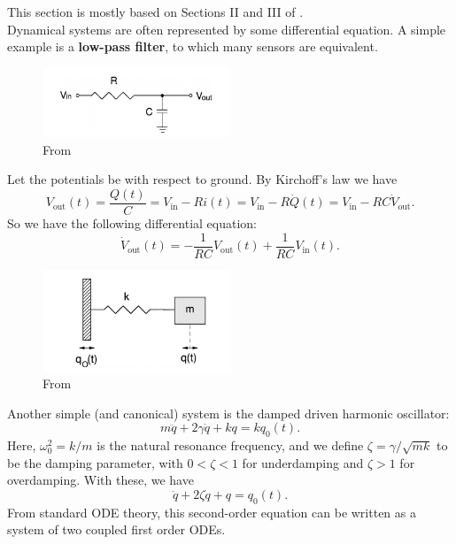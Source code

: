 \documentclass{book}
\theoremstyle{definition}
\newcommand{\f}[2]{\frac{#1}{#2}}
\begin{document}
This section is mostly based on Sections II and III of \cite{bechhoefer2005feedback}. \\


Dynamical systems are often represented by some differential equation. A simple example is a \textbf{low-pass filter}, to which many sensors are equivalent. 

\begin{figure}[!htb]
	\centering
	\includegraphics[width=0.5\textwidth]{images/low-pass-filter}
	\caption{From \cite{bechhoefer2005feedback}}
\end{figure}

Let the potentials be with respect to ground. By Kirchoff's law we have
\begin{equation*}
V_\text{out}(t) = \f{Q(t)}{C} = V_\text{in} - Ri(t) = V_\text{in} - R\dot{Q}(t) = V_\text{in} - RC\dot{V}_\text{out}.
\end{equation*}
So we have the following differential equation:
\begin{equation*}
\dot{V}_\text{out}(t) = -\f{1}{RC} V_\text{out}(t) + \f{1}{RC}V_\text{in}(t).
\end{equation*}


\begin{figure}[!htb]
	\centering
	\includegraphics[width=0.5\textwidth]{images/DDHO}
	\caption{From \cite{bechhoefer2005feedback}}
\end{figure}



Another simple (and canonical) system is the damped driven harmonic oscillator:
\begin{equation*}
m\ddot{q} + 2\gamma \dot{q} + kq = k q_0(t).
\end{equation*}
Here, $\omega_0^2 = k/m$ is the natural resonance frequency, and we define $\zeta = \gamma/ \sqrt{mk}$ to be the damping parameter, with $0 <\zeta <1 $ for underdamping and $\zeta > 1$ for overdamping. With these, we have
\begin{equation*}
\ddot{q} + 2\zeta \dot{q} + q = q_0(t). 
\end{equation*}
From standard ODE theory, this second-order equation can be written as a system of two coupled first order ODEs. 
\end{document}
